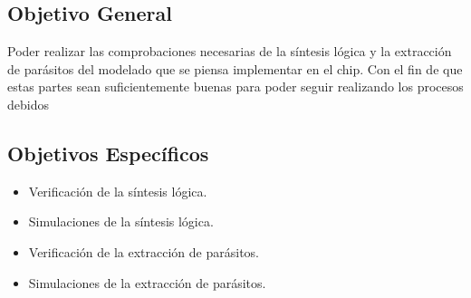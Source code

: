 \subsection*{Objetivo General}

Poder realizar las comprobaciones necesarias de la síntesis lógica y la extracción de parásitos del modelado que se piensa implementar en el chip. Con el fin de que estas partes sean suficientemente buenas para poder seguir realizando los procesos debidos

\subsection*{Objetivos Específicos}
\begin{itemize}
\item Verificación de la síntesis lógica. 
\item Simulaciones de la síntesis lógica.
\item Verificación de la extracción de parásitos.
\item Simulaciones de la extracción de parásitos.
\end{itemize}